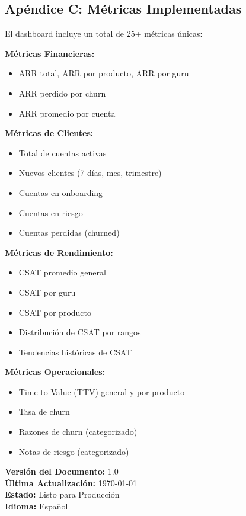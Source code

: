 \documentclass[12pt,a4paper]{article}
\begin{document}
\subsection{Apéndice C: Métricas Implementadas}

El dashboard incluye un total de 25+ métricas únicas:

\textbf{Métricas Financieras:}
\begin{itemize}
    \item ARR total, ARR por producto, ARR por guru
    \item ARR perdido por churn
    \item ARR promedio por cuenta
\end{itemize}

\textbf{Métricas de Clientes:}
\begin{itemize}
    \item Total de cuentas activas
    \item Nuevos clientes (7 días, mes, trimestre)
    \item Cuentas en onboarding
    \item Cuentas en riesgo
    \item Cuentas perdidas (churned)
\end{itemize}

\textbf{Métricas de Rendimiento:}
\begin{itemize}
    \item CSAT promedio general
    \item CSAT por guru
    \item CSAT por producto
    \item Distribución de CSAT por rangos
    \item Tendencias históricas de CSAT
\end{itemize}

\textbf{Métricas Operacionales:}
\begin{itemize}
    \item Time to Value (TTV) general y por producto
    \item Tasa de churn
    \item Razones de churn (categorizado)
    \item Notas de riesgo (categorizado)
\end{itemize}

\vspace{1cm}

\noindent\textbf{Versión del Documento:} 1.0 \\
\textbf{Última Actualización:} \today \\
\textbf{Estado:} Listo para Producción \\
\textbf{Idioma:} Español
\end{document}
